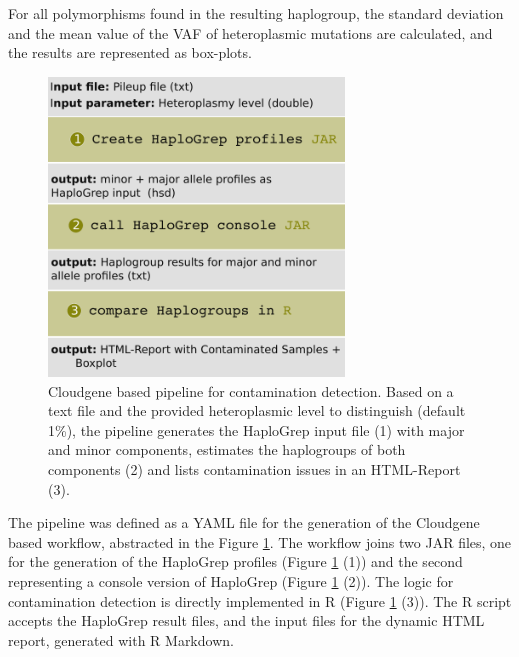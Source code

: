 For all polymorphisms found in the resulting haplogroup, the standard deviation and the mean value of the VAF of heteroplasmic mutations are calculated, and the results are represented as box-plots. 
\begin{figure}[!ht]
    \centering
    \includegraphics[width=0.7\textwidth]{images/workflow_haplochecker.png}
    \caption[Cloudgene pipeline for contamination detection]{Cloudgene based pipeline for contamination detection. Based on a text file and the provided heteroplasmic level to distinguish (default 1\%), the pipeline generates the HaploGrep input file (1) with major and minor components, estimates the haplogroups  of both components (2) and lists contamination issues in an HTML-Report (3).} 
    \label{cont:workflow}
\end{figure}

The pipeline was defined as a YAML file for the generation of the Cloudgene based workflow, abstracted in the Figure \ref{cont:workflow}. The workflow joins two JAR files, one for the generation of the HaploGrep profiles (Figure \ref{cont:workflow} (1)) and the second representing a console version of HaploGrep (Figure \ref{cont:workflow} (2)). The logic for contamination detection is directly implemented in R (Figure \ref{cont:workflow} (3)). The R script accepts the HaploGrep result files, and the input files for the dynamic HTML report, generated with R Markdown. 

